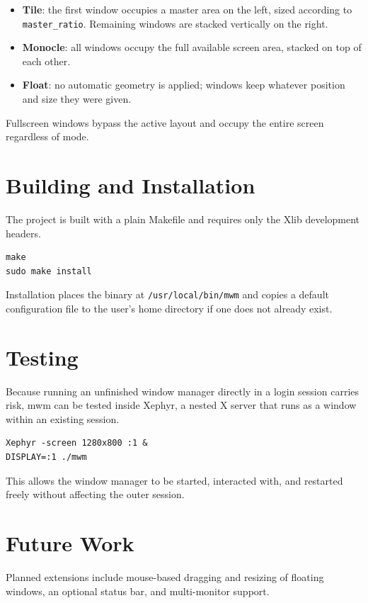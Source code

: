 \documentclass[11pt,a4paper]{article}
\begin{document}
\begin{itemize}
  \item \textbf{Tile}: the first window occupies a master area on the
        left, sized according to \texttt{master\_ratio}. Remaining
        windows are stacked vertically on the right.
  \item \textbf{Monocle}: all windows occupy the full available screen
        area, stacked on top of each other.
  \item \textbf{Float}: no automatic geometry is applied; windows keep
        whatever position and size they were given.
\end{itemize}

Fullscreen windows bypass the active layout and occupy the entire screen
regardless of mode.

\section{Building and Installation}

The project is built with a plain Makefile and requires only the Xlib
development headers.

\begin{lstlisting}
make
sudo make install
\end{lstlisting}

Installation places the binary at \texttt{/usr/local/bin/mwm} and copies
a default configuration file to the user's home directory if one does
not already exist.

\section{Testing}

Because running an unfinished window manager directly in a login session
carries risk, mwm can be tested inside Xephyr, a nested X server that
runs as a window within an existing session.

\begin{lstlisting}
Xephyr -screen 1280x800 :1 &
DISPLAY=:1 ./mwm
\end{lstlisting}

This allows the window manager to be started, interacted with, and
restarted freely without affecting the outer session.

\section{Future Work}

Planned extensions include mouse-based dragging and resizing of floating
windows, an optional status bar, and multi-monitor support.
\end{document}
